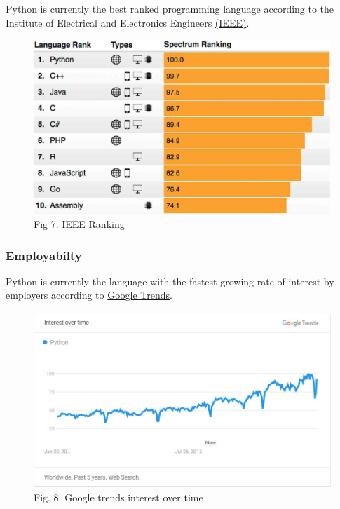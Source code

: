 \documentclass[11pt]{article}
\makeatletter
\def\maxwidth{\ifdim\Gin@nat@width>\linewidth\linewidth
    \else\Gin@nat@width\fi}
\let\Oldincludegraphics\includegraphics
\renewcommand{\includegraphics}[1]{\Oldincludegraphics[width=.8\maxwidth]{#1}}
\makeatother
\begin{document}
    Python is currently the best ranked programming language according to
the Institute of Electrical and Electronics Engineers
\href{https://spectrum.ieee.org/at-work/innovation/the-2018-top-programming-languages}{(IEEE)}.

    \begin{figure}[H]
\centering
\includegraphics{figs/stats3.jpg}
\caption{Fig 7. IEEE Ranking}
\end{figure}

    \hypertarget{employabilty}{%
\subsubsection{Employabilty}\label{employabilty}}

    Python is currently the language with the fastest growing rate of
interest by employers according to
\href{https://medium.freecodecamp.org/best-programming-languages-to-learn-in-2018-ultimate-guide-bfc93e615b35}{Google
Trends}.

    \begin{figure}[H]
\centering
\includegraphics{figs/stats2.jpg}
\caption{Fig. 8. Google trends interest over time}
\end{figure}
\end{document}
